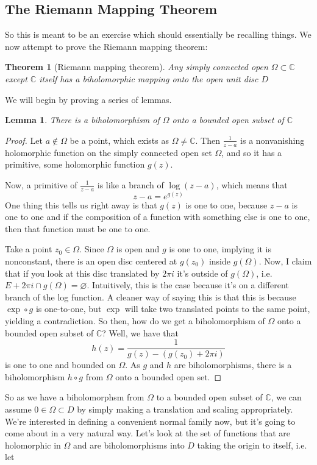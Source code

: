 \documentclass{article}
\newtheorem{theorem}{Theorem}
\newtheorem{lemma}{Lemma}
\newcommand{\mbb}[1]{\mathbb{#1}}
\begin{document}
\subsection{The Riemann Mapping Theorem}

So this is meant to be an exercise which should essentially be recalling things. We now attempt to prove the Riemann mapping theorem:
\begin{theorem}[Riemann mapping theorem]
Any simply connected open \(\Omega \subset \mbb{C}\) except \(\mbb{C}\) itself has a biholomorphic mapping onto the open unit disc \(D\)
\end{theorem}
We will begin by proving a series of lemmas.
\begin{lemma}
There is a biholomorphism of \(\Omega\) onto a bounded open subset of \(\mbb{C}\)
\end{lemma}
\begin{proof}
Let \(a \notin \Omega\) be a point, which exists as \(\Omega \neq \mbb{C}\). Then \(\frac{1}{z - a}\) is a nonvanishing holomorphic function on the simply connected open set \(\Omega\), and so it has a primitive, some holomorphic function \(g(z)\).

Now, a primitive of \(\frac{1}{z - a}\) is like a branch of \(\log(z - a)\), which means that
\[z - a = e^{g(z)}\]
One thing this tells us right away is that \(g(z)\) is one to one, because \(z - a\) is one to one and if the composition of a function with something else is one to one, then that function must be one to one.

Take a point \(z_0 \in \Omega\). Since \(\Omega\) is open and \(g\) is one to one, implying it is nonconstant, there is an open disc centered at \(g(z_0)\) inside \(g(\Omega)\). Now, I claim that if you look at this disc translated by \(2\pi i\) it's outside of \(g(\Omega)\), i.e. \(E + 2\pi i \cap g(\Omega) = \varnothing\). Intuitively, this is the case because it's on a different branch of the log function. A cleaner way of saying this is that this is because \(\exp \circ g\) is one-to-one, but \(\exp\) will take two translated points to the same point, yielding a contradiction.
So then, how do we get a biholomorphism of \(\Omega\) onto a bounded open subset of \(\mbb{C}\)? Well, we have that
\[h(z) = \frac{1}{g(z) - (g(z_0) + 2\pi i)}\]
is one to one and bounded on \(\Omega\). As \(g\) and \(h\) are biholomorphisms, there is a biholomorphism \(h \circ g\) from \(\Omega\) onto a bounded open set.
\end{proof}
So as we have a biholomorphsm from \(\Omega\) to a bounded open subset of \(\mbb{C}\), we can assume \(0 \in \Omega \subset D\) by simply making a translation and scaling appropriately. We're interested in defining a convenient normal family now, but it's going to come about in a very natural way. Let's look at the set of functions that are holomorphic in \(\Omega\) and are biholomorphisms into \(D\) taking the origin to itself, i.e. let
\end{document}
